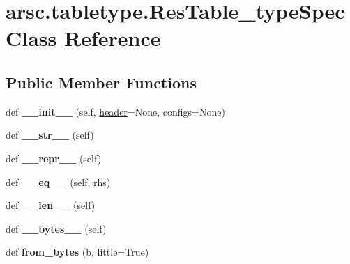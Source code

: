 \hypertarget{classarsc_1_1tabletype_1_1ResTable__typeSpec}{}\section{arsc.\+tabletype.\+Res\+Table\+\_\+type\+Spec Class Reference}
\label{classarsc_1_1tabletype_1_1ResTable__typeSpec}
\subsection*{Public Member Functions}
\begin{DoxyCompactItemize}
\item 
\mbox{\label{classarsc_1_1tabletype_1_1ResTable__typeSpec_a6b579a3f52c013cc138265e967f193c7}} 
def {\bfseries \+\_\+\+\_\+init\+\_\+\+\_\+} (self, \mbox{\hyperlink{classarsc_1_1tabletype_1_1ResTable__typeSpec_a1defbb9dd0346ae4733f2d795c0d093f}{header}}=None, configs=None)
\item 
\mbox{\label{classarsc_1_1tabletype_1_1ResTable__typeSpec_af48af4cfaead28cf478d900eec560267}} 
def {\bfseries \+\_\+\+\_\+str\+\_\+\+\_\+} (self)
\item 
\mbox{\label{classarsc_1_1tabletype_1_1ResTable__typeSpec_a71664714fcf49554d72a5b1b07dc765b}} 
def {\bfseries \+\_\+\+\_\+repr\+\_\+\+\_\+} (self)
\item 
\mbox{\label{classarsc_1_1tabletype_1_1ResTable__typeSpec_ac5b5336f499c6ac60d0e6b8fa7fdefef}} 
def {\bfseries \+\_\+\+\_\+eq\+\_\+\+\_\+} (self, rhs)
\item 
\mbox{\label{classarsc_1_1tabletype_1_1ResTable__typeSpec_a7b8c5fab591d8f97f63e0e739d0b23f7}} 
def {\bfseries \+\_\+\+\_\+len\+\_\+\+\_\+} (self)
\item 
\mbox{\label{classarsc_1_1tabletype_1_1ResTable__typeSpec_ade2ca10e30cb336c20c169d87b703fc4}} 
def {\bfseries \+\_\+\+\_\+bytes\+\_\+\+\_\+} (self)
\item 
\mbox{\label{classarsc_1_1tabletype_1_1ResTable__typeSpec_abbfaffd121b1bb43766b2a6b276679f2}} 
def {\bfseries from\+\_\+bytes} (b, little=True)
\end{DoxyCompactItemize}
